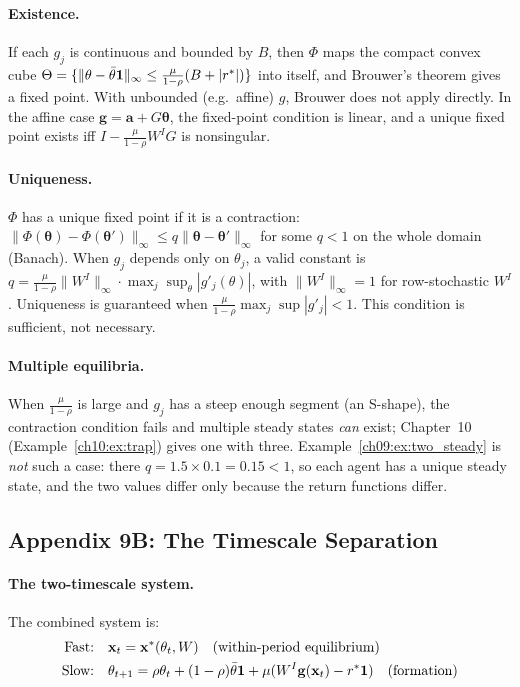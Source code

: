\documentclass[../structural_economics_book.tex]{subfiles}
\begin{document}
\paragraph{Existence.} If each $g_j$ is continuous and bounded by $B$, then $\Phi$ maps the compact convex cube $\Theta = \{\|\theta - \bar{\theta}\mathbf{1}\|_\infty \le \frac{\mu}{1-\rho}(B + |r^*|)\}$ into itself, and Brouwer's theorem gives a fixed point. With unbounded (e.g.\ affine) $g$, Brouwer does not apply directly. In the affine case $\mathbf{g} = \mathbf{a} + G\boldsymbol{\theta}$, the fixed-point condition is linear, and a unique fixed point exists iff $I - \frac{\mu}{1-\rho}W^IG$ is nonsingular.

\paragraph{Uniqueness.} $\Phi$ has a unique fixed point if it is a contraction: $\|\Phi(\boldsymbol{\theta}) - \Phi(\boldsymbol{\theta}')\|_\infty \leq q\|\boldsymbol{\theta} - \boldsymbol{\theta}'\|_\infty$ for some $q < 1$ on the whole domain (Banach). When $g_j$ depends only on $\theta_j$, a valid constant is $q = \frac{\mu}{1-\rho}\|W^I\|_\infty \cdot \max_j \sup_\theta |g'_j(\theta)|$, with $\|W^I\|_\infty = 1$ for row-stochastic $W^I$. Uniqueness is guaranteed when $\frac{\mu}{1-\rho}\max_j\sup|g'_j| < 1$. This condition is sufficient, not necessary.

\paragraph{Multiple equilibria.} When $\frac{\mu}{1-\rho}$ is large and $g_j$ has a steep enough segment (an S-shape), the contraction condition fails and multiple steady states \textit{can} exist; Chapter~10 (Example~\ref{ch10:ex:trap}) gives one with three. Example~\ref{ch09:ex:two_steady} is \textit{not} such a case: there $q = 1.5 \times 0.1 = 0.15 < 1$, so each agent has a unique steady state, and the two values differ only because the return functions differ.


\subsection*{Appendix 9B: The Timescale Separation}
\label{ch09:app:timescale}

\paragraph{The two-timescale system.} The combined system is:
\begin{align}
\text{Fast:} \quad & \mathbf{x}_t = \mathbf{x}^*(\theta_t, W) \quad \text{(within-period equilibrium)} \\
\text{Slow:} \quad & \theta_{t+1} = \rho\theta_t + (1-\rho)\bar{\theta}\mathbf{1} + \mu(W^I \mathbf{g}(\mathbf{x}_t) - r^*\mathbf{1}) \quad \text{(formation)}
\end{align}
\end{document}
